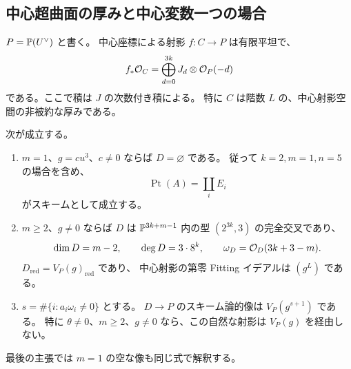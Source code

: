 \subsection{中心超曲面の厚みと中心変数一つの場合}

$P=\mathbb P(U^\vee)$ と書く。
中心座標による射影 $f:C\to P$ は有限平坦で、
\begin{equation}\label{csp:eq:central-algebra}
 f_*\mathcal O_C=\bigoplus_{d=0}^{3k}J_d\otimes\mathcal O_P(-d)
\end{equation}
である。ここで積は $J$ の次数付き積による。
特に $C$ は階数 $L$ の、中心射影空間の非被約な厚みである。

\begin{proposition}[中心成分の消滅と完全交叉]
\label{csp:prop:central-component}
次が成立する。
\begin{enumerate}
 \item $m=1$、$g=cu^3$、$c\ne0$ ならば $D=\varnothing$ である。
 従って $k=2,m=1,n=5$ の場合を含め、
 \[
 \operatorname{Pt}(A)=\coprod_i E_i
 \]
 がスキームとして成立する。
 \item $m\ge2$、$g\ne0$ ならば $D$ は
 $\mathbb P^{3k+m-1}$ 内の型 $(2^{3k},3)$ の完全交叉であり、
 \begin{equation}\label{csp:eq:complete-intersection}
 \dim D=m-2,\qquad \deg D=3\cdot8^k,\qquad
 \omega_D=\mathcal O_D(3k+3-m).
 \end{equation}
 $D_{\mathrm{red}}=V_P(g)_{\mathrm{red}}$ であり、
 中心射影の第零 Fitting イデアルは $(g^L)$ である。
 \item $s=\#\{i:a_i\omega_i\ne0\}$ とする。
 $D\to P$ のスキーム論的像は $V_P(g^{s+1})$ である。
 特に $\theta\ne0$、$m\ge2$、$g\ne0$ なら、この自然な射影は
 $V_P(g)$ を経由しない。
\end{enumerate}
最後の主張では $m=1$ の空な像も同じ式で解釈する。
\end{proposition}

